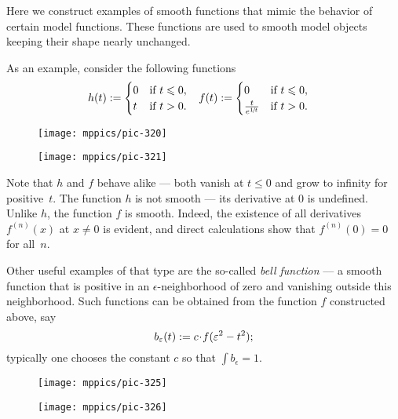 Here we construct examples of smooth functions that mimic the behavior of certain model functions.
These functions are used to smooth model objects keeping their shape nearly unchanged.

As an example, consider the following functions
\begin{align*}
h(t)&\mathrel{:=}
\begin{cases}
0&\text{if}\ t\leqslant 0,
\\
t&\text{if}\ t> 0.
\end{cases}
&
f(t)&\mathrel{:=}
\begin{cases}
0&\text{if}\ t\leqslant 0,
\\
\frac{t}{e^{1\!/\!t}}&\text{if}\ t> 0.
\end{cases}
\end{align*}
\begin{figure}[ht!]
\begin{minipage}{.48\textwidth}
\centering
\texttt{[image: mppics/pic-320]}
\end{minipage}\hfill
\begin{minipage}{.48\textwidth}
\centering
\texttt{[image: mppics/pic-321]}
\end{minipage}
\end{figure}
Note that $h$ and $f$ behave alike ---
both vanish at $t\le 0$ and grow to infinity for positive~$t$.
The function $h$ is not smooth --- its derivative at $0$ is undefined.
Unlike $h$, the function $f$ is smooth.
Indeed, the existence of all derivatives $f^{(n)}(x)$ at $x\ne 0$ is evident, and direct calculations show that $f^{(n)}(0)=0$ for all~$n$.

Other useful examples of that type are the so-called \emph{bell function} --- a smooth function that is positive in an $\epsilon$-neighborhood of zero and vanishing outside this neighborhood.
Such functions can be obtained from the function $f$ constructed above, say 
\[b_\epsilon(t)\df c\cdot f(\epsilon^2-t^2);\]
typically one chooses the constant $c$ so that $\int b_\epsilon=1$.

\begin{figure}[ht!]
\begin{minipage}{.48\textwidth}
\centering
\texttt{[image: mppics/pic-325]}
\end{minipage}\hfill
\begin{minipage}{.48\textwidth}
\centering
\texttt{[image: mppics/pic-326]}
\end{minipage}
\end{figure}

